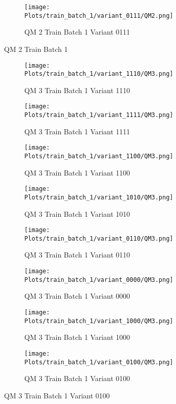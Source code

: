 \documentclass{DissertateFigs}
\begin{document}
\begin{figure}[t!]
\medskip

    \begin{subfigure}{0.47\textwidth}
    \texttt{[image: Plots/train\_batch\_1/variant\_0111/QM2.png]}
    \caption{QM 2 Train Batch 1 Variant 0111}
    \end{subfigure}
\caption{QM 2 Train Batch 1}
    \end{figure}
\clearpage
\begin{figure}[t!]
    \begin{subfigure}{0.47\textwidth}
    \texttt{[image: Plots/train\_batch\_1/variant\_1110/QM3.png]}
    \caption{QM 3 Train Batch 1 Variant 1110}
    \end{subfigure}
    \begin{subfigure}{0.47\textwidth}
    \texttt{[image: Plots/train\_batch\_1/variant\_1111/QM3.png]}
    \caption{QM 3 Train Batch 1 Variant 1111}
    \end{subfigure}

\medskip

    \begin{subfigure}{0.47\textwidth}
    \texttt{[image: Plots/train\_batch\_1/variant\_1100/QM3.png]}
    \caption{QM 3 Train Batch 1 Variant 1100}
    \end{subfigure}
    \begin{subfigure}{0.47\textwidth}
    \texttt{[image: Plots/train\_batch\_1/variant\_1010/QM3.png]}
    \caption{QM 3 Train Batch 1 Variant 1010}
    \end{subfigure}

\medskip

    \begin{subfigure}{0.47\textwidth}
    \texttt{[image: Plots/train\_batch\_1/variant\_0110/QM3.png]}
    \caption{QM 3 Train Batch 1 Variant 0110}
    \end{subfigure}
    \begin{subfigure}{0.47\textwidth}
    \texttt{[image: Plots/train\_batch\_1/variant\_0000/QM3.png]}
    \caption{QM 3 Train Batch 1 Variant 0000}
    \end{subfigure}

\medskip

    \begin{subfigure}{0.47\textwidth}
    \texttt{[image: Plots/train\_batch\_1/variant\_1000/QM3.png]}
    \caption{QM 3 Train Batch 1 Variant 1000}
    \end{subfigure}
    \begin{subfigure}{0.47\textwidth}
    \texttt{[image: Plots/train\_batch\_1/variant\_0100/QM3.png]}
    \caption{QM 3 Train Batch 1 Variant 0100}
    \end{subfigure}


\end{figure}
\end{document}
